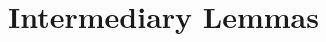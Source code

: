 \documentclass[11pt]{article}
\begin{document}
%
%
%
%
%
%
%
\section{Intermediary Lemmas}
\end{document}
